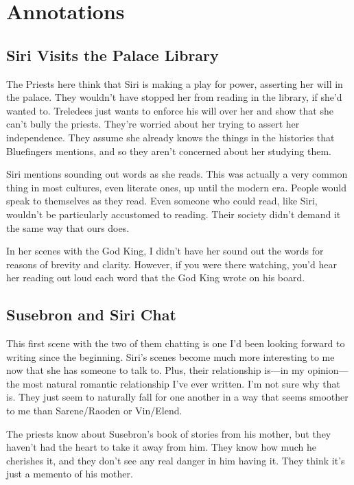 \section*{Annotations}

\subsection*{Siri Visits the Palace Library}

The Priests here think that Siri is making a play for power, asserting her will in the palace. They wouldn’t have stopped her from reading in the library, if she’d wanted to. Treledees just wants to enforce his will over her and show that she can’t bully the priests. They’re worried about her trying to assert her independence. They assume she already knows the things in the histories that Bluefingers mentions, and so they aren’t concerned about her studying them.

Siri mentions sounding out words as she reads. This was actually a very common thing in most cultures, even literate ones, up until the modern era. People would speak to themselves as they read. Even someone who could read, like Siri, wouldn’t be particularly accustomed to reading. Their society didn’t demand it the same way that ours does.

In her scenes with the God King, I didn’t have her sound out the words for reasons of brevity and clarity. However, if you were there watching, you’d hear her reading out loud each word that the God King wrote on his board.

\subsection*{Susebron and Siri Chat}

This first scene with the two of them chatting is one I’d been looking forward to writing since the beginning. Siri’s scenes become much more interesting to me now that she has someone to talk to. Plus, their relationship is—in my opinion—the most natural romantic relationship I’ve ever written. I’m not sure why that is. They just seem to naturally fall for one another in a way that seems smoother to me than Sarene/Raoden or Vin/Elend.

The priests know about Susebron’s book of stories from his mother, but they haven’t had the heart to take it away from him. They know how much he cherishes it, and they don’t see any real danger in him having it. They think it’s just a memento of his mother.

